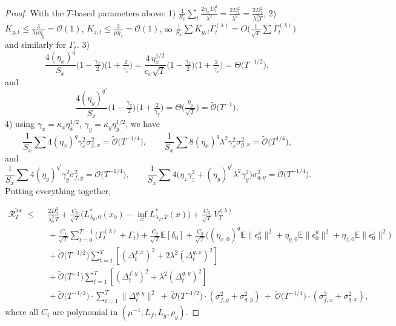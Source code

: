 \documentclass{uai2026} %
\newcommand{\EE}{\mathbb{E}}
\begin{document}
\begin{proof}
With the $T$-based parameters above: 1) $\frac{1}{S_x}\sum_{t} \frac{2\eta_x D_1^2}{\lambda^2} = \frac{2D_1^2}{\lambda^2} = \frac{2D_1^2}{\lambda_0^2 T}$, 2) $K_{y,t}\le \frac{3}{\lambda\mu\eta_y}=\mathcal{O}(1)$, $K_{z,t}\le \frac{3}{\mu\eta_z}=\mathcal{O}(1)$, so
  $\frac{1}{S_x}\sum K_{y,t}\Gamma_t^{(\lambda)}=O\big(\frac{1}{\sqrt{T}}\sum \Gamma_t^{(\lambda)}\big)$
  and similarly for $\Gamma_t$. 3)
  $$
  \frac{4(\eta_x)^q}{S_x}\Big(1-\tfrac{\gamma_x}{2}\Big)\Big(1+\tfrac{2}{\gamma_x}\Big)
  = \frac{4\,\eta_x^{1/2}}{c_x\sqrt{T}}\Big(1-\tfrac{\gamma_x}{2}\Big)\Big(1+\tfrac{2}{\gamma_x}\Big)
  = \Theta\!\Big(T^{-1/2}\Big),
  $$
  and
  $$
  \frac{4(\eta_y)^{q'}}{S_x}\Big(1-\tfrac{\gamma_y}{2}\Big)\Big(1+\tfrac{2}{\gamma_y}\Big)
  = \Theta\!\Big(\tfrac{\eta_y}{\sqrt{T}}\Big)
  = \tilde{\mathcal{O}}\!\big(T^{-1}\big),
  $$
4) using $\gamma_x=\kappa_x \eta_x^{1/2}$, $\gamma_y=\kappa_y \eta_y^{1/2}$, we have
  $$
  \frac{1}{S_x}\sum 4(\eta_x)^q\gamma_x^2\sigma_{f,x}^2
  = \tilde{\mathcal{O}}\!\big(T^{-1/4}\big),\qquad
  \frac{1}{S_x}\sum 8(\eta_x)^q\lambda^2\gamma_x^2\sigma_{g,x}^2
  = \tilde{\mathcal{O}}\!\big(T^{1/4}\big),
  $$
and
  $$
  \frac{1}{S_x}\sum 4(\eta_y)^{q'}\gamma_y^2\sigma_{f,y}^2
  = \tilde{\mathcal{O}}\!\big(T^{-1/4}\big),\qquad
  \frac{1}{S_x}\sum 4\big(\eta_z\gamma_z^2+(\eta_y)^{q'}\lambda^2\gamma_y^2\big)\sigma_{g,y}^2
  = \tilde{\mathcal{O}}\!\big(T^{-1/4}\big).
  $$
Putting everything together,


\begin{align}
\mathcal{R}^{\mathrm{loc}}_T
\;\le\;
&\ \frac{2D_1^2}{\lambda_0^2\,T}
+\frac{C_0}{\sqrt{T}}\Big(L^{*}_{\lambda_0,0}(x_0)-\inf_x L^{*}_{\lambda_T,T}(x)\Big)
+\frac{C_0}{\sqrt{T}}\,V_T^{(\lambda)}\\
&\ +\frac{C_1}{\sqrt{T}}\sum_{t=0}^{T-1}\!\big(\Gamma_t^{(\lambda)}+\Gamma_t\big)
+\frac{C_2}{\sqrt{T}}\EE[\delta_0]
+\frac{C_3}{\sqrt{T}}\Big((\eta_{x,0})^{q}\EE\|\epsilon^x_0\|^2+\eta_{y,0}\EE\|\epsilon^y_0\|^2+\eta_{z,0}\EE\|\epsilon^z_0\|^2\Big)\\
&\ +\tilde{\mathcal{O}}\!\Big(T^{-1/2}\Big)\sum_{t=1}^{T}\left[(\Delta_t^{f,x})^2+2\lambda^2(\Delta_t^{g,x})^2\right]\\
&\ +\tilde{\mathcal{O}}\!\Big(T^{-1}\Big)\!\sum_{t=1}^{T}\left[(\Delta_t^{f,y})^2+\lambda^2(\Delta_t^{g,y})^2\right]\\
&\ +\tilde{\mathcal{O}}\!\big(T^{-1/2}\big)\cdot\sum_{t=1}^{T}\|\Delta_t^{g,y}\|^2
\ +\ \tilde{\mathcal{O}}\!\big(T^{-1/2}\big)\cdot(\sigma_{f,y}^2+\sigma_{g,y}^2)
\ +\ \tilde{\mathcal{O}}\!\big(T^{-1/4}\big)\cdot(\sigma_{f,x}^2+\sigma_{g,x}^2),
\end{align}
where all $C_i$ are polynomial in $(\mu^{-1},L_f,L_g,\rho_g)$.


\end{proof}
\end{document}
